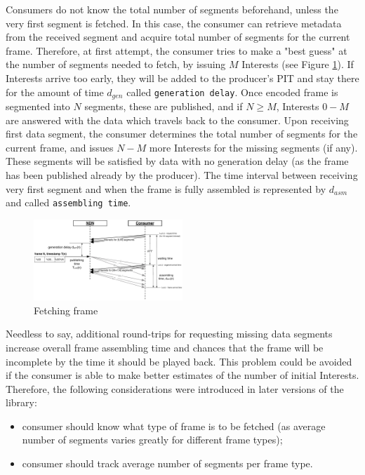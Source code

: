 \documentclass{icn/sig-alternate-2012} %
\begin{document}
Consumers do not know the total number of segments beforehand, unless the very first segment is fetched. In this case, the consumer can retrieve metadata from the received segment and acquire total number of segments for the current frame. 
Therefore, at first attempt, the consumer tries to make a "best guess" at the number of segments needed to fetch, by issuing $M$ Interests (see Figure \ref{fig:pull}). If Interests arrive too early, they will be added to the producer's PIT and stay there for the amount of time $d_{gen}$ called \texttt{generation delay}. Once encoded frame is segmented into $N$ segments, these are published, and if $N\geq M$, Interests $0 - M$ are answered with the data which travels back to the consumer. Upon receiving first data segment, the consumer determines the total number of segments for the current frame, and issues $N - M$ more Interests for the missing segments (if any). These segments will be satisfied by data with no generation delay (as the frame has been published already by the producer). The time interval between receiving very first segment and when the frame is fully assembled is represented by $d_{asm}$ and called \texttt{assembling time}.

\begin{figure}[t!]
\centering
\includegraphics[width=0.5\textwidth]{frame-fetch}
\vspace{-18pt}
\caption{Fetching frame}
\label{fig:pull}
\end{figure}

Needless to say, additional round-trips for requesting missing data segments increase overall frame assembling time and chances that the frame will be incomplete by the time it should be played back. This problem could be avoided if the consumer is able to make better estimates of the number of initial Interests. Therefore, the following considerations were introduced in later versions of the library:
\begin{itemize}
\item consumer should know what type of frame is to be fetched (as average number of segments varies greatly for different frame types);
\item consumer should track average number of segments per frame type.
\end{itemize}
\end{document}
